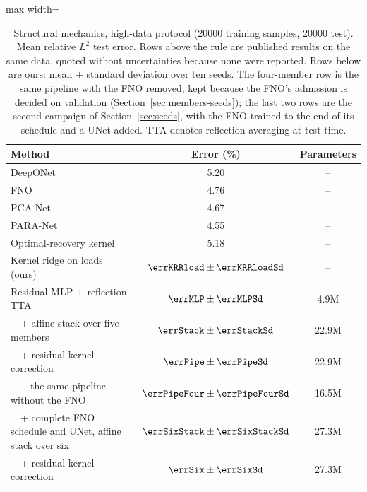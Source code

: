 \begin{table}[t]
\centering
\caption{Structural mechanics, high-data protocol (20000 training samples,
20000 test). Mean relative $L^2$ test error. Rows above the rule are
published results on the same data, quoted without uncertainties because none
were reported. Rows below are ours: mean $\pm$ standard deviation over ten
seeds. The four-member row is the same pipeline with the FNO removed, kept
because the FNO's admission is decided on validation
(Section~\ref{sec:members-seeds}); the last two rows are the second campaign
of Section~\ref{sec:seeds}, with the FNO trained to the end of its schedule
and a UNet added. TTA denotes reflection averaging at test time.}
\label{tab:main}
\begin{adjustbox}{max width=\linewidth}
\begin{tabular}{lcc}
\toprule
Method & Error (\%) & Parameters \\
\midrule
DeepONet \citep{dehoop2022cost} & 5.20 & -- \\
FNO \citep{dehoop2022cost} & 4.76 & -- \\
PCA-Net \citep{dehoop2022cost} & 4.67 & -- \\
PARA-Net \citep{dehoop2022cost} & 4.55 & -- \\
Optimal-recovery kernel \citep{batlle2024kernel} & 5.18 & -- \\
\midrule
Kernel ridge on loads (ours) & $\errKRRload\pm\errKRRloadSd$ & -- \\
Residual MLP + reflection TTA & $\errMLP\pm\errMLPSd$ & 4.9M \\
\ \ + affine stack over five members & $\errStack\pm\errStackSd$ & 22.9M \\
\ \ + residual kernel correction & $\errPipe\pm\errPipeSd$ & 22.9M \\
\ \ \ \ the same pipeline without the FNO & $\errPipeFour\pm\errPipeFourSd$ & 16.5M \\
\ \ + complete FNO schedule and UNet, affine stack over six & $\errSixStack\pm\errSixStackSd$ & 27.3M \\
\ \ + residual kernel correction & $\errSix\pm\errSixSd$ & 27.3M \\
\bottomrule
\end{tabular}
\end{adjustbox}
\end{table}
